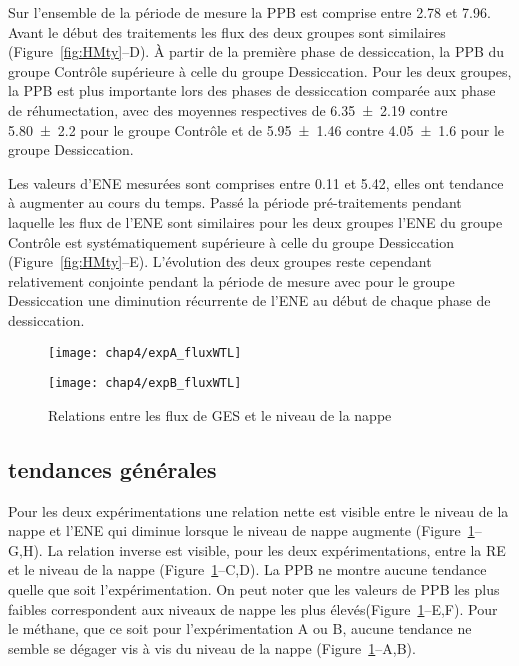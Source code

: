 Sur l'ensemble de la période de mesure la PPB est comprise entre \num{2.78} et \SI{7.96}{\uml}.
Avant le début des traitements les flux des deux groupes sont similaires (Figure~\ref{fig:HMty}--D).
À partir de la première phase de dessiccation, la PPB du groupe Contrôle supérieure à celle du groupe Dessiccation.
Pour les deux groupes, la PPB est plus importante lors des phases de dessiccation comparée aux phase de réhumectation, avec des moyennes respectives de \num{6.35(219)} contre \num{5.80(220)} pour le groupe Contrôle et de \num{5.95(146)} contre \SI{4.05(160)}{\uml} pour le groupe Dessiccation.

Les valeurs d'ENE mesurées sont comprises entre \num{0.11} et \SI{5.42}{\uml}, elles ont tendance à augmenter au cours du temps.
Passé la période pré-traitements pendant laquelle les flux de l'ENE sont similaires pour les deux groupes l'ENE du groupe Contrôle est systématiquement supérieure à celle du groupe Dessiccation (Figure~\ref{fig:HMty}--E).
L'évolution des deux groupes reste cependant relativement conjointe pendant la période de mesure avec pour le groupe Dessiccation une diminution récurrente de l'ENE au début de chaque phase de dessiccation.

\begin{figure}
\centering
\begin{minipage}{.5\textwidth}
\centering
\texttt{[image: chap4/expA\_fluxWTL]}
\end{minipage}%
\begin{minipage}{.5\textwidth}
\centering
\texttt{[image: chap4/expB\_fluxWTL]}
\end{minipage}%
\caption{Relations entre les flux de GES et le niveau de la nappe}
\label{fig:hm_wtl}
\end{figure}

\subsection{tendances générales}

Pour les deux expérimentations une relation nette est visible entre le niveau de la nappe et l'ENE qui diminue lorsque le niveau de nappe augmente (Figure~\ref{fig:hm_wtl}--G,H).
La relation inverse est visible, pour les deux expérimentations, entre la RE et le niveau de la nappe (Figure~\ref{fig:hm_wtl}--C,D).
La PPB ne montre aucune tendance quelle que soit l'expérimentation.
On peut noter que les valeurs de PPB les plus faibles correspondent aux niveaux de nappe les plus élevés(Figure~\ref{fig:hm_wtl}--E,F).
Pour le méthane, que ce soit pour l'expérimentation A ou B, aucune tendance ne semble se dégager vis à vis du niveau de la nappe (Figure~\ref{fig:hm_wtl}--A,B).


